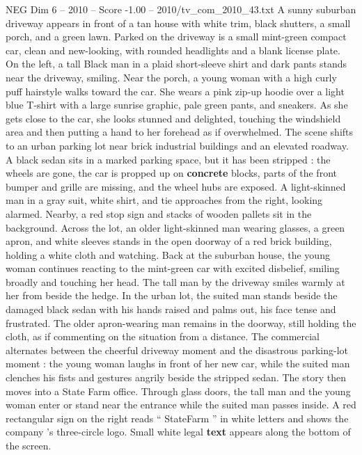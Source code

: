 \begin{textsample}{NEG Dim 6 – 2010 – Score -1.00 – 2010/tv\_com\_2010\_43.txt}  \label{ex:f6_neg_016}
A sunny suburban driveway appears in front of a tan house with white trim, black shutters, a small porch, and a green lawn.
Parked on the driveway is a small mint-green compact car, clean and new-looking, with rounded headlights and a blank license plate.
On the left, a tall Black man in a plaid short-sleeve shirt and dark pants stands near the driveway, smiling.
Near the porch, a young woman with a high curly puff hairstyle walks toward the car.
She wears a pink zip-up hoodie over a light blue T-shirt with a large sunrise graphic, pale green pants, and sneakers.
As she gets close to the car, she looks stunned and delighted, touching the windshield area and then putting a hand to her forehead as if overwhelmed.
The scene shifts to an urban parking lot near brick industrial buildings and an elevated roadway.
A black sedan sits in a marked parking space, but it has been stripped : the wheels are gone, the car is propped up on \textbf{concrete} blocks, parts of the front bumper and grille are missing, and the wheel hubs are exposed.
A light-skinned man in a gray suit, white shirt, and tie approaches from the right, looking alarmed.
Nearby, a red stop sign and stacks of wooden pallets sit in the background.
Across the lot, an older light-skinned man wearing glasses, a green apron, and white sleeves stands in the open doorway of a red brick building, holding a white cloth and watching.
Back at the suburban house, the young woman continues reacting to the mint-green car with excited disbelief, smiling broadly and touching her head.
The tall man by the driveway smiles warmly at her from beside the hedge.
In the urban lot, the suited man stands beside the damaged black sedan with his hands raised and palms out, his face tense and frustrated.
The older apron-wearing man remains in the doorway, still holding the cloth, as if commenting on the situation from a distance.
The commercial alternates between the cheerful driveway moment and the disastrous parking-lot moment : the young woman laughs in front of her new car, while the suited man clenches his fists and gestures angrily beside the stripped sedan.
The story then moves into a State Farm office.
Through glass doors, the tall man and the young woman enter or stand near the entrance while the suited man passes inside.
A red rectangular sign on the right reads “ StateFarm ” in white letters and shows the company ’s three-circle logo.
Small white legal \textbf{text} appears along the bottom of the screen.

\end{textsample}
